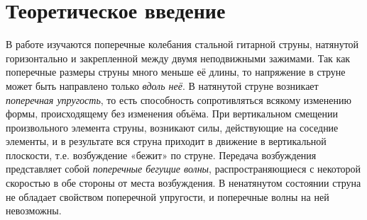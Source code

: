 \section{Теоретическое введение}
В работе изучаются поперечные колебания стальной гитарной струны, натянутой горизонтально и закрепленной между двумя неподвижными зажимами. Так как поперечные размеры струны много меньше её длины, то напряжение в струне может быть направлено только \textit{вдоль неё}. В натянутой струне возникает \textit{поперечная упругость}, то есть способность сопротивляться всякому изменению формы, происходящему без изменения объёма. При вертикальном смещении произвольного элемента струны, возникают силы, действующие на соседние элементы, и в результате вся струна приходит в движение в вертикальной плоскости, т.е. возбуждение «бежит» по струне. Передача возбуждения представляет собой \textit{поперечные бегущие волны}, распространяющиеся с некоторой скоростью в обе стороны от места возбуждения. В ненатянутом состоянии струна не обладает свойством поперечной упругости, и поперечные волны на ней невозможны.


